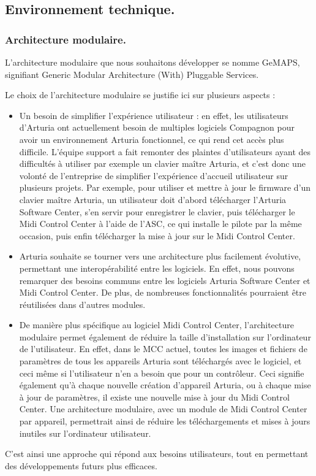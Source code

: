 \documentclass[francais]{rapportPFE}  %
\begin{document}
\subsection{Environnement technique.}

\subsubsection{Architecture modulaire.}
L'architecture modulaire que nous souhaitons développer se nomme GeMAPS, signifiant Generic Modular Architecture (With) Pluggable Services. 

Le choix de l'architecture modulaire se justifie ici sur plusieurs aspects : 
\begin{itemize}
    \item Un besoin de simplifier l'expérience utilisateur : en effet, les utilisateurs d'Arturia ont actuellement besoin de multiples logiciels Compagnon pour avoir un environnement Arturia fonctionnel, ce qui rend cet accès plus difficile. L'équipe support a fait remonter des plaintes d'utilisateurs ayant des difficultés à utiliser par exemple un clavier maître Arturia, et c'est donc une volonté de l'entreprise de simplifier l'expérience d'accueil utilisateur sur plusieurs projets. Par exemple, pour utiliser et mettre à jour le firmware d'un clavier maître Arturia, un utilisateur doit d'abord télécharger l'Arturia Software Center, s'en servir pour enregistrer le clavier, puis télécharger le Midi Control Center à l'aide de l'ASC, ce qui installe le pilote par la même occasion, puis enfin télécharger la mise à jour sur le Midi Control Center.
    \item Arturia souhaite se tourner vers une architecture plus facilement évolutive, permettant une interopérabilité entre les logiciels. En effet, nous pouvons remarquer des besoins communs entre les logiciels Arturia Software Center et Midi Control Center. De plus, de nombreuses fonctionnalités pourraient être réutilisées dans d'autres modules.
    \item De manière plus spécifique au logiciel Midi Control Center, l'architecture modulaire permet également de réduire la taille d'installation sur l'ordinateur de l'utilisateur. En effet, dans le MCC actuel, toutes les images et fichiers de paramètres de tous les appareils Arturia sont téléchargés avec le logiciel, et ceci même si l'utilisateur n'en a besoin que pour un contrôleur. Ceci signifie également qu'à chaque nouvelle création d'appareil Arturia, ou à chaque mise à jour de paramètres, il existe une nouvelle mise à jour du Midi Control Center. Une architecture modulaire, avec un module de Midi Control Center par appareil, permettrait ainsi de réduire les téléchargements et mises à jours inutiles sur l'ordinateur utilisateur.
\end{itemize}
C'est ainsi une approche qui répond aux besoins utilisateurs, tout en permettant des développements futurs plus efficaces.
\end{document}
